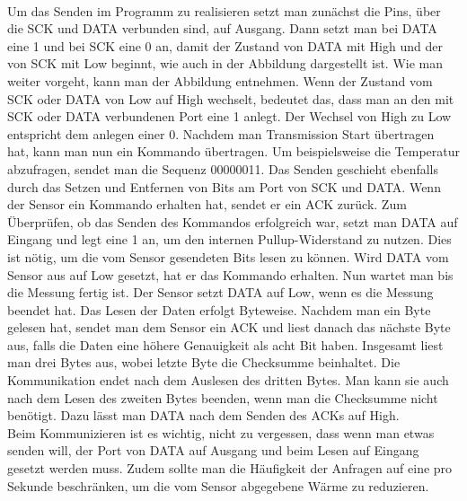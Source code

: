 \documentclass[]{article}
\begin{document}
\\ Um das Senden im Programm zu realisieren setzt man zunächst die Pins, über die SCK und DATA verbunden sind, auf Ausgang. Dann setzt man bei DATA eine 1 und bei SCK eine 0 an, damit der Zustand von DATA mit High und der von SCK mit Low beginnt, wie auch in der Abbildung dargestellt ist. Wie man weiter vorgeht, kann man der Abbildung entnehmen. Wenn der Zustand vom SCK oder DATA von Low auf High wechselt, bedeutet das, dass man an den mit SCK oder DATA verbundenen Port eine 1 anlegt. Der Wechsel von High zu Low entspricht dem anlegen einer 0. Nachdem man Transmission Start übertragen hat, kann man nun ein Kommando übertragen. Um beispielsweise die Temperatur abzufragen, sendet man die Sequenz 00000011. Das Senden geschieht ebenfalls durch das Setzen und Entfernen von Bits am Port von SCK und DATA. Wenn der Sensor ein Kommando erhalten hat, sendet er ein ACK zurück. Zum Überprüfen, ob das Senden des Kommandos erfolgreich war, setzt man DATA auf Eingang und legt eine 1 an, um den internen Pullup-Widerstand zu nutzen. Dies ist nötig, um die vom Sensor gesendeten Bits lesen zu können. Wird DATA vom Sensor aus auf Low gesetzt, hat er das Kommando erhalten. Nun wartet man bis die Messung fertig ist. Der Sensor setzt DATA auf Low, wenn es die Messung beendet hat. Das Lesen der Daten erfolgt Byteweise. Nachdem man ein Byte gelesen hat, sendet man dem Sensor ein ACK und liest danach das nächste Byte aus, falls die Daten eine höhere Genauigkeit als acht Bit haben. Insgesamt liest man drei Bytes aus, wobei letzte Byte die Checksumme beinhaltet. Die Kommunikation endet nach dem Auslesen des dritten Bytes. Man kann sie auch nach dem Lesen des zweiten Bytes beenden, wenn man die Checksumme nicht benötigt. Dazu lässt man DATA nach dem Senden des ACKs auf High. 
\\Beim Kommunizieren ist es wichtig, nicht zu vergessen, dass wenn man etwas senden will, der Port von DATA auf Ausgang und beim Lesen auf Eingang gesetzt werden muss. Zudem sollte man die Häufigkeit der Anfragen auf eine pro Sekunde beschränken, um die vom Sensor abgegebene Wärme zu reduzieren.
\end{document}
